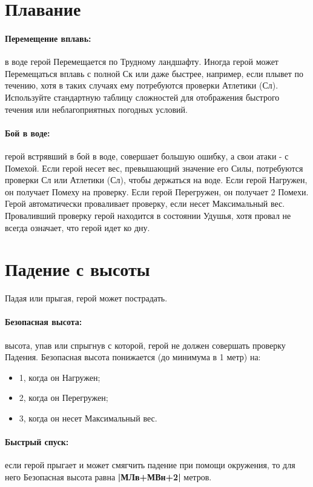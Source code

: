 \section{Плавание}
\paragraph{Перемещение вплавь:} в воде герой Перемещается по Трудному ландшафту. Иногда герой может Перемещаться вплавь с полной Ск или даже быстрее, например, если плывет по течению, хотя в таких случаях ему потребуются проверки Атлетики (Сл). Используйте стандартную таблицу сложностей для отображения быстрого течения или неблагоприятных погодных условий.
\paragraph{Бой в воде:} герой встрявший в бой в воде, совершает большую ошибку, а свои атаки - с Помехой. 
\newline Если герой несет вес, превышающий значение его Силы, потребуются проверки Сл или Атлетики (Сл), чтобы держаться на воде. Если герой Нагружен, он получает Помеху на проверку. Если герой Перегружен, он получает 2 Помехи. Герой автоматически проваливает проверку, если несет Максимальный вес. 
\newline Проваливший проверку герой находится в состоянии Удушья, хотя провал не всегда означает, что герой идет ко дну. 

\section{Падение с высоты}
Падая или прыгая, герой может пострадать. 
\paragraph{Безопасная высота:} высота, упав или спрыгнув с которой, герой не должен совершать проверку Падения. Безопасная высота понижается (до минимума в 1 метр) на:
\begin{itemize}
  \item 1, когда он Нагружен;
  \item 2, когда он Перегружен;
  \item 3, когда он несет Максимальный вес.
\end{itemize}
\paragraph{Быстрый спуск:} если герой прыгает и может смягчить падение при помощи окружения, то для него Безопасная высота равна \textbf{|МЛв+МВн+2|} метров.
